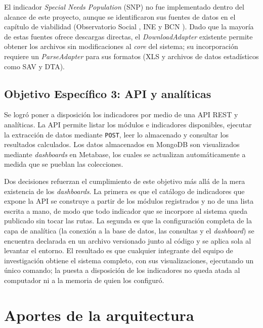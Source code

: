 \documentclass[12pt,letterpaper,oneside]{report}
\begin{document}
El indicador \textit{Special Needs Population} (SNP) no fue implementado dentro del alcance de este proyecto, aunque se identificaron sus fuentes de datos en el cap\'itulo de viabilidad (Observatorio Social \parencite{observatoriosocial}, INE \parencite{ine-b} y BCN \parencite{bcn-c}). Dado que la mayor\'ia de estas fuentes ofrece descargas directas, el \textit{DownloadAdapter} existente permite obtener los archivos sin modificaciones al \textit{core} del sistema; su incorporaci\'on requiere un \textit{ParseAdapter} para sus formatos (XLS y archivos de datos estad\'isticos como SAV y DTA).

\subsection{Objetivo Espec\'ifico 3: API y anal\'iticas}
\label{sec:conclusion-oe3}

Se logr\'o poner a disposici\'on los indicadores por medio de una API REST y anal\'iticas. La API permite listar los m\'odulos e indicadores disponibles, ejecutar la extracci\'on de datos mediante \texttt{POST}, leer lo almacenado y consultar los resultados calculados. Los datos almacenados en MongoDB son visualizados mediante \textit{dashboards} en Metabase, los cuales se actualizan autom\'aticamente a medida que se pueblan las colecciones.

Dos decisiones refuerzan el cumplimiento de este objetivo m\'as all\'a de la mera existencia de los \textit{dashboards}. La primera es que el cat\'alogo de indicadores que expone la API se construye a partir de los m\'odulos registrados y no de una lista escrita a mano, de modo que todo indicador que se incorpore al sistema queda publicado sin tocar las rutas. La segunda es que la configuraci\'on completa de la capa de anal\'itica (la conexi\'on a la base de datos, las consultas y el \textit{dashboard}) se encuentra declarada en un archivo versionado junto al c\'odigo y se aplica sola al levantar el entorno. El resultado es que cualquier integrante del equipo de investigaci\'on obtiene el sistema completo, con sus visualizaciones, ejecutando un \'unico comando; la puesta a disposici\'on de los indicadores no queda atada al computador ni a la memoria de quien los configur\'o.

\section{Aportes de la arquitectura}
\label{sec:aportes-arquitectura}
\end{document}
